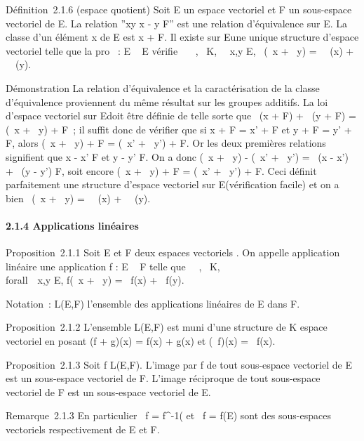 \documentclass[]{article}
\begin{document}
Définition~2.1.6 (espace quotient) Soit E un espace vectoriel et F un
sous-espace vectoriel de E. La relation ''xy
\Leftrightarrow x - y \in F'' est une relation d'équivalence
sur E. La classe d'un élément x de E est x + F. Il existe sur E\diagupF une
unique structure d'espace vectoriel telle que la pro\jmathection \pi~ : E \rightarrow~ E\diagupF
vérifie \forall~~\alpha~,\beta~ \in K,
\forall~~x,y \in E, \pi~(\alpha~x + \beta~y) = \alpha~\pi~(x) + \beta~\pi~(y).

Démonstration La relation d'équivalence et la caractérisation de la
classe d'équivalence proviennent du même résultat sur les groupes
additifs. La loi d'espace vectoriel sur E\diagupF doit être définie de telle
sorte que \alpha~(x + F) + \beta~(y + F) = (\alpha~x + \beta~y) + F~; il suffit donc de
vérifier que si x + F = x' + F et y + F = y' + F, alors (\alpha~x + \beta~y) + F =
(\alpha~x' + \beta~y') + F. Or les deux premières relations signifient que x - x' \in
F et y - y' \in F. On a donc (\alpha~x + \beta~y) - (\alpha~x' + \beta~y') = \alpha~(x - x') + \beta~(y -
y') \in F, soit encore (\alpha~x + \beta~y) + F = (\alpha~x' + \beta~y') + F. Ceci définit
parfaitement une structure d'espace vectoriel sur E\diagupF (vérification
facile) et on a bien \pi~(\alpha~x + \beta~y) = \alpha~\pi~(x) + \beta~\pi~(y).

\paragraph{2.1.4 Applications linéaires}

Proposition~2.1.1 Soit E et F deux espaces vectoriels . On appelle
application linéaire une application f : E \rightarrow~ F telle que
\forall~\alpha~,\beta~ \in K, \\forall~~x,y \in E,
f(\alpha~x + \beta~y) = \alpha~f(x) + \beta~f(y).

Notation~: L(E,F) l'ensemble des applications linéaires de E dans F.

Proposition~2.1.2 L'ensemble L(E,F) est muni d'une structure de K espace
vectoriel en posant (f + g)(x) = f(x) + g(x) et (\lambda~f)(x) = \lambda~f(x).

Proposition~2.1.3 Soit f \in L(E,F). L'image par f de tout sous-espace
vectoriel de E est un sous-espace vectoriel de F. L'image réciproque de
tout sous-espace vectoriel de F est un sous-espace vectoriel de E.

Remarque~2.1.3 En particulier
\mathrmKer~f =
f^-1(\0\) et
\mathrmIm~f = f(E) sont des
sous-espaces vectoriels respectivement de E et F.
\end{document}
